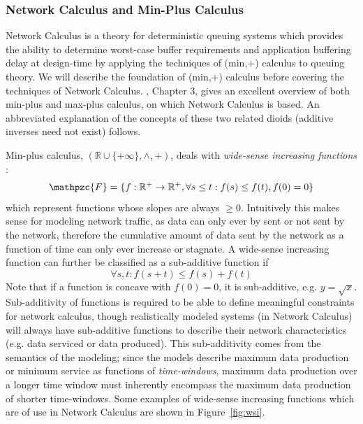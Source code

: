 \subsubsection{Network Calculus and Min-Plus Calculus}
Network Calculus\cite{NC_Cruz1991}\cite{NC_Cruz1991a}\cite{NCBook} is
a theory for deterministic queuing systems which provides the ability
to determine worst-case buffer requirements and application buffering
delay at design-time by applying the techniques of (min,+) calculus to
queuing theory.  We will describe the foundation of (min,+) calculus
before covering the techniques of Network Calculus. \cite{NCBook},
Chapter 3, gives an excellent overview of both min-plus and max-plus
calculus, on which Network Calculus is based.  An abbreviated
explanation of the concepts of these two related dioids (additive
inverses need not exist) follows.

Min-plus calculus, $(\mathbb{R}\cup\{+\infty\},\wedge,+)$, deals with \textit{wide-sense increasing functions} : 
\begin{equation}
\mathpzc{F}=\{f : \mathbb{R}^+ \rightarrow \mathbb{R}^+, \forall s \leq t : f(s) \leq f(t), f(0) = 0\}
\end{equation}
which represent functions whose slopes are always $\geq 0$.
Intuitively this makes sense for modeling network traffic, as data can
only ever by sent or not sent by the network, therefore the cumulative
amount of data sent by the network as a function of time can only ever
increase or stagnate.  A wide-sense increasing function can further be
classified as a sub-additive function if
\begin{equation}
\forall s,t : f(s+t) \leq f(s) + f(t)
\end{equation}
Note that if a function is concave with $f(0)=0$, it is sub-additive,
e.g. $y=\sqrt{x}$.  Sub-additivity of functions is required to be able
to define meaningful constraints for network calculus, though
realistically modeled systems (in Network Calculus) will always have
sub-additive functions to describe their network characteristics
(e.g. data serviced or data produced).  This sub-additivity comes from
the semantics of the modeling; since the models describe maximum data
production or minimum service as functions of \emph{time-windows},
maximum data production over a longer time window must inherently
encompass the maximum data production of shorter time-windows.  Some
examples of wide-sense increasing functions which are of use in
Network Calculus are shown in Figure~\ref{fig:wsi}.

